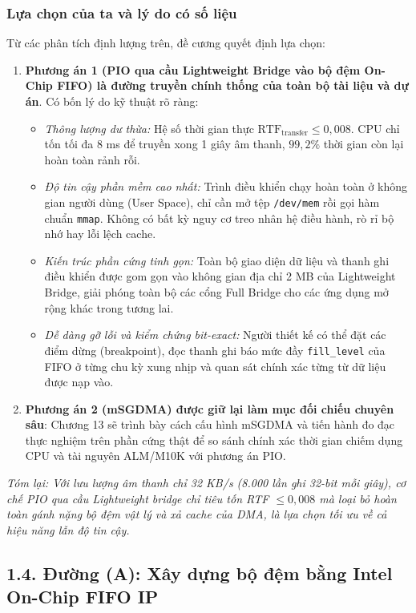 \subsubsection*{Lựa chọn của ta và lý do có số liệu}
Từ các phân tích định lượng trên, đề cương quyết định lựa chọn:
\begin{enumerate}[leftmargin=1.5em, itemsep=3pt]
    \item \textbf{Phương án 1 (PIO qua cầu Lightweight Bridge vào bộ đệm On-Chip FIFO) là đường truyền chính thống của toàn bộ tài liệu và dự án}. Có bốn lý do kỹ thuật rõ ràng:
    \begin{itemize}[leftmargin=1.2em, itemsep=2pt]
        \item \emph{Thông lượng dư thừa:} Hệ số thời gian thực $\text{RTF}_{\text{transfer}} \le 0{,}008$. CPU chỉ tốn tối đa 8 ms để truyền xong 1 giây âm thanh, $99{,}2\%$ thời gian còn lại hoàn toàn rảnh rỗi.
        \item \emph{Độ tin cậy phần mềm cao nhất:} Trình điều khiển chạy hoàn toàn ở không gian người dùng (User Space), chỉ cần mở tệp \texttt{/dev/mem} rồi gọi hàm chuẩn \texttt{mmap}. Không có bất kỳ nguy cơ treo nhân hệ điều hành, rò rỉ bộ nhớ hay lỗi lệch cache.
        \item \emph{Kiến trúc phần cứng tinh gọn:} Toàn bộ giao diện dữ liệu và thanh ghi điều khiển được gom gọn vào không gian địa chỉ 2 MB của Lightweight Bridge, giải phóng toàn bộ các cổng Full Bridge cho các ứng dụng mở rộng khác trong tương lai.
        \item \emph{Dễ dàng gỡ lỗi và kiểm chứng bit-exact:} Người thiết kế có thể đặt các điểm dừng (breakpoint), đọc thanh ghi báo mức đầy \texttt{fill\_level} của FIFO ở từng chu kỳ xung nhịp và quan sát chính xác từng từ dữ liệu được nạp vào.
    \end{itemize}
    \item \textbf{Phương án 2 (mSGDMA) được giữ lại làm mục đối chiếu chuyên sâu}: Chương 13 sẽ trình bày cách cấu hình mSGDMA và tiến hành đo đạc thực nghiệm trên phần cứng thật để so sánh chính xác thời gian chiếm dụng CPU và tài nguyên ALM/M10K với phương án PIO.
\end{enumerate}

\textit{Tóm lại: Với lưu lượng âm thanh chỉ 32 KB/s (8.000 lần ghi 32-bit mỗi giây), cơ chế PIO qua cầu Lightweight bridge chỉ tiêu tốn RTF $\le 0{,}008$ mà loại bỏ hoàn toàn gánh nặng bộ đệm vật lý và xả cache của DMA, là lựa chọn tối ưu về cả hiệu năng lẫn độ tin cậy.}

\subsection*{1.4. Đường (A): Xây dựng bộ đệm bằng Intel On-Chip FIFO IP}

